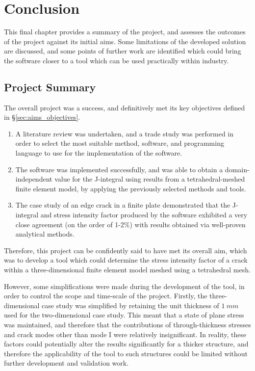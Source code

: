 \chapter{Conclusion}\label{sec:conclusion}

This final chapter provides a summary of the project, and assesses the outcomes of the project against its initial aims. Some limitations of the developed solution are discussed, and some points of further work are identified which could bring the software closer to a tool which can be used practically within industry.

\newpage
\section{Project Summary}

The overall project was a success, and definitively met its key objectives defined in §\ref{sec:aims_objectives}.

\begin{enumerate}
	\item A literature review was undertaken, and a trade study was performed in order to select the most suitable method, software, and programming language to use for the implementation of the software.
	\item The software was implemented successfully, and was able to obtain a domain-independent value for the J-integral using results from a tetrahedral-meshed finite element model, by applying the previously selected methods and tools.
	\item The case study of an edge crack in a finite plate demonstrated that the J-integral and stress intensity factor produced by the software exhibited a very close agreement (on the order of 1-2\%) with results obtained via well-proven analytical methods.
\end{enumerate}

Therefore, this project can be confidently said to have met its overall aim, which was to develop a tool which could determine the stress intensity factor of a crack within a three-dimensional finite element model meshed using a tetrahedral mesh.

However, some simplifications were made during the development of the tool, in order to control the scope and time-scale of the project. Firstly, the three-dimensional case study was simplified by retaining the unit thickness of $1\ mm$ used for the two-dimensional case study. This meant that a state of plane stress was maintained, and therefore that the contributions of through-thickness stresses and crack modes other than mode I were relatively insignificant. In reality, these factors could potentially alter the results significantly for a thicker structure, and therefore the applicability of the tool to such structures could be limited without further development and validation work.

